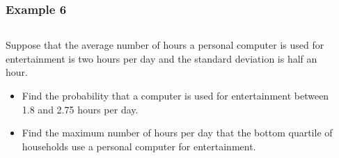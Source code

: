 \documentclass[12pt,twocolumn]{article}
\begin{document}
\begin{frame}[t]
 \frametitle{Example 6}
 \begin{columns}
  \begin{column}{0.5\textwidth}
    Suppose that the average number of hours a personal computer is used for entertainment is two hours per day and the standard deviation is half an hour.

    \begin{itemize}
     \item Find the probability that a computer is used for entertainment between 1.8 and 2.75 hours per day.
     \item Find the maximum number of hours per day that the bottom quartile of households use a personal computer for entertainment.
    \end{itemize}
  \end{column}
  \begin{column}{0.5\textwidth}
  \end{column}
 \end{columns}
\end{frame}
\end{document}
